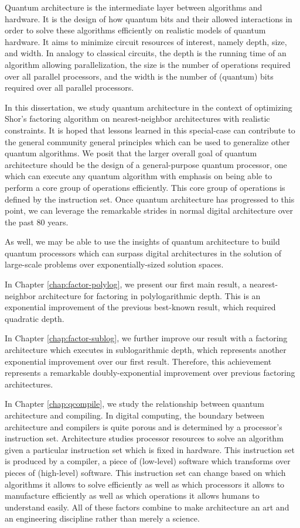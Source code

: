 Quantum architecture is the intermediate layer between algorithms and hardware.
It is the design of how quantum bits and their allowed interactions in order to solve these algorithms efficiently on realistic models of quantum hardware.
It aims to minimize circuit resources of interest, namely depth, size, and width. In analogy to classical circuits, the depth is the running time of an algorithm allowing parallelization, the size is the number of operations required over all parallel processors, and the width is the number of (quantum) bits required over all parallel processors.

In this dissertation, we study quantum architecture in the context of optimizing Shor's factoring algorithm on nearest-neighbor architectures with realistic constraints. It is hoped that lessons learned in this special-case can contribute to the general community general principles which can be used to generalize other quantum algorithms. We posit that the larger overall goal of quantum architecture should be the design of a general-purpose quantum processor, one which can execute any quantum algorithm with emphasis on being able to perform a core group of operations efficiently. This core group of operations is defined by the instruction set. Once quantum architecture has progressed to this point, we can leverage the remarkable strides in normal digital architecture over the past 80 years.

As well, we may be able to use the insights of quantum architecture to build quantum processors which can surpass digital architectures in the solution of large-scale problems over exponentially-sized solution spaces.

In Chapter \ref{chap:factor-polylog}, we present our first main result, a
nearest-neighbor architecture for factoring in polylogarithmic depth. This is an exponential improvement of the previous best-known result, which required quadratic depth.

In Chapter \ref{chap:factor-sublog}, we further improve our result with a
factoring architecture which executes in sublogarithmic depth, which represents another exponential improvement over our first result. Therefore, this achievement represents a remarkable doubly-exponential improvement over previous factoring architectures.

In Chapter \ref{chap:qcompile}, we study the relationship between quantum architecture and compiling. In digital computing, the boundary between architecture and compilers is quite porous and is determined by a processor's instruction set. Architecture studies processor resources to solve an algorithm given a particular instruction set which is fixed in hardware. This instruction set is produced by a compiler, a piece of (low-level) software which transforms over pieces of (high-level) software. This instruction set can change based on which algorithms it allows to solve efficiently as well as which processors it allows to manufacture efficiently as well as which operations it allows humans to understand easily. All of these factors combine to make architecture an art and an engineering discipline rather than merely a science.


